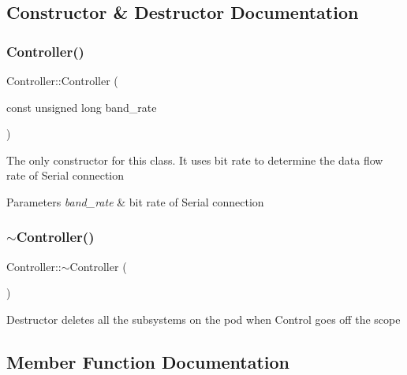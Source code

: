 \subsection{Constructor \& Destructor Documentation}
\mbox{\label{class_controller_ae9b318779cd66bba433238054b8c64a4}} 
\subsubsection{\texorpdfstring{Controller()}{Controller()}}
{\footnotesize\ttfamily Controller\+::\+Controller (\begin{DoxyParamCaption}\item[{const unsigned long}]{band\+\_\+rate }\end{DoxyParamCaption})}

The only constructor for this class. It uses bit rate to determine the data flow rate of Serial connection 
\begin{DoxyParams}{Parameters}
{\em band\+\_\+rate} & bit rate of Serial connection \\
\hline
\end{DoxyParams}
\mbox{\label{class_controller_a0ab87934c4f7a266cfdb86e0f36bc1b5}} 
\subsubsection{\texorpdfstring{$\sim$\+Controller()}{~Controller()}}
{\footnotesize\ttfamily Controller\+::$\sim$\+Controller (\begin{DoxyParamCaption}{ }\end{DoxyParamCaption})}

Destructor deletes all the subsystems on the pod when Control goes off the scope 

\subsection{Member Function Documentation}
\mbox{\label{class_controller_a018a5dbae5b2f28fd65a4ebfa1c1ba13}} 
